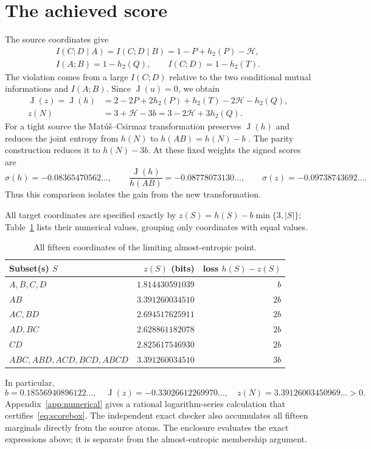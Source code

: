 \documentclass[a4paper,11pt]{article}
\newcommand{\Ing}{\operatorname{J}}
\newcommand{\hb}{h_2}
\begin{document}
\section{The achieved score}\label{sec:score}
The source coordinates give
\begin{gather*}
 I(C;D\mid A)=I(C;D\mid B)=1-P+\hb(P)-\mathcal H,\\
 I(A;B)=1-\hb(Q),\qquad I(C;D)=1-\hb(T).
\end{gather*}
The violation comes from a large $I(C;D)$ relative to the two conditional
mutual informations and $I(A;B)$. Since $\Ing(u)=0$, we obtain
\begin{align}
 \Ing(z)=\Ing(h)
 &=2-2P+2\hb(P)+\hb(T)-2\mathcal H-\hb(Q),\label{eq:Jformula}\\
 z(N)&=3+\mathcal H-3b=3-2\mathcal H+3\hb(Q).\label{eq:den}
\end{align}
For a tight source the Mat\'u\v{s}--Csirmaz transformation preserves
$\Ing(h)$ and reduces the joint entropy from $h(N)$ to $h(AB)=h(N)-b$
\cite[Theorem~4 and Section~8]{MC}. The parity construction reduces it
to $h(N)-3b$. At these fixed weights the signed scores are
\[
 \sigma(h)=-0.08365470562\ldots,\qquad
 \frac{\Ing(h)}{h(AB)}=-0.08778073130\ldots,\qquad
 \sigma(z)=-0.09738743692\ldots .
\]
Thus this comparison isolates the gain from the new transformation.

All target coordinates are specified exactly by
$z(S)=h(S)-b\min\{3,|S|\}$; Table~\ref{tab:target} lists their numerical
values, grouping only coordinates with equal values.
\begin{table}[ht]
\centering
\begin{tabular}{lrr}
\toprule
Subset(s) $S$ & $z(S)$ (bits) & loss $h(S)-z(S)$\\
\midrule
$A,B,C,D$ & $1.814430591039$ & $b$\\
$AB$ & $3.391260034510$ & $2b$\\
$AC,BD$ & $2.694517625911$ & $2b$\\
$AD,BC$ & $2.628861182078$ & $2b$\\
$CD$ & $2.825617546930$ & $2b$\\
$ABC,ABD,ACD,BCD,ABCD$ & $3.391260034510$ & $3b$\\
\bottomrule
\end{tabular}
\caption{All fifteen coordinates of the limiting almost-entropic point.}
\label{tab:target}
\end{table}
In particular,
\[
 b=0.18556940896122\ldots,\quad
 \Ing(z)=-0.33026612269970\ldots,\quad
 z(N)=3.39126003450969\ldots>0.
\]
Appendix~\ref{app:numerical} gives a rational logarithm-series calculation
that certifies~\eqref{eq:scorebox}. The independent exact checker also
accumulates all fifteen marginals directly from the source atoms.
The enclosure evaluates the exact expressions above; it is separate
from the almost-entropic membership argument.
\end{document}
